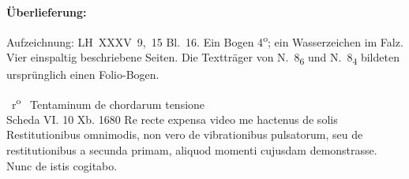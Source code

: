 %
%
%
\begin{ledgroupsized}[r]{120mm}
\footnotesize
\pstart
\noindent\textbf{Überlieferung:}
\pend
\end{ledgroupsized}
\begin{ledgroupsized}[r]{114mm}
\footnotesize
\pstart \parindent -6mm
%
Aufzeichnung: LH~XXXV~9,~15 Bl.~16.
Ein Bogen 4\textsuperscript{o};
ein Wasserzeichen im Falz. %
Vier einspaltig beschriebene Seiten.
Die Textträger von N.~8\textsubscript{6} und N.~8\textsubscript{4} bildeten ursprünglich einen Folio-Bogen.
\pend
\end{ledgroupsized}
%
%
\vspace*{4mm}
\pstart%
\normalsize%
\noindent%
%
~r\textsuperscript{o}\rbrack\ %
%
\pend%
\pstart%
\count{}
\count{}
\count{}
\centering%
Tentaminum\protect{}
de chordarum tensione\protect{}\\
Scheda\protect{} VI. 10 Xb. 1680
\pend%
\vspace{0.5em}%
%
\pstart%
\noindent%
Re recte expensa video me hactenus
de solis Restitutionibus omnimodis,\protect{}
non vero de vibrationibus
pulsatorum,
seu de restitutionibus a secunda
primam, aliquod momenti\protect{} cujusdam demonstrasse.
%
Nunc de istis cogitabo.
\pend%
%
\pstart%
